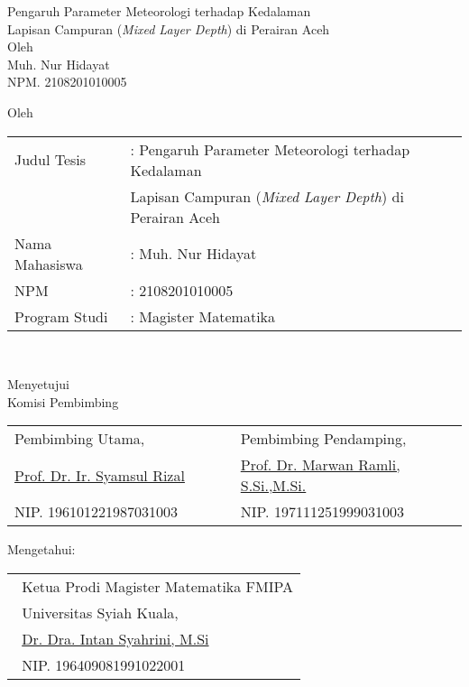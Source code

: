 \setcounter{page}{2}
\vspace{2pc}

\begin{center}
	\normalsize
	\noindent
	Pengaruh Parameter Meteorologi terhadap Kedalaman \\
	Lapisan Campuran (\textit{Mixed Layer Depth}) di Perairan Aceh \\
	
	\vspace{2cm}
	Oleh \\
	Muh. Nur Hidayat\\
	NPM. 2108201010005
\end{center}

\begin{center}
	\normalsize
	\noindent
	Oleh
	\begin{tabular}{l l l}
		Judul Tesis \verb"  " &: Pengaruh Parameter Meteorologi terhadap Kedalaman \\
		& Lapisan Campuran (\textit{Mixed Layer Depth}) di Perairan Aceh  \\
		Nama Mahasiswa &: Muh. Nur Hidayat \\
		NPM &: 2108201010005 \\
		Program Studi	&: Magister Matematika \\ 
	\end{tabular} \\
\end{center}
\begin{center}
	\vspace{4cm}
	Menyetujui\\
	Komisi Pembimbing
	
	\vspace{1cm}
	
	\begin{tabular}{l l }
		Pembimbing Utama,\verb"                 " & Pembimbing Pendamping, \verb"            "\\[2.25cm]
		\underline{Prof. Dr. Ir. Syamsul Rizal} & \underline{Prof. Dr. Marwan Ramli, S.Si.,M.Si.}\\
		NIP. 196101221987031003 & NIP. 197111251999031003
	\end{tabular}
\end{center}

\begin{center}
	\vspace{0.5cm}
	Mengetahui:\\%
	
	\vspace{1cm}
	
	\begin{tabular}{l }
		\verb" "Ketua Prodi Magister Matematika FMIPA\\
		\verb" "Universitas Syiah Kuala,\\[2.25cm]
		\verb" "\underline{Dr. Dra. Intan Syahrini, M.Si}\\
		\verb" "NIP. 196409081991022001
	\end{tabular}
\end{center}
\vspace{0.3cm}
\begin{center}
	
\end{center}
\thispagestyle{empty}
